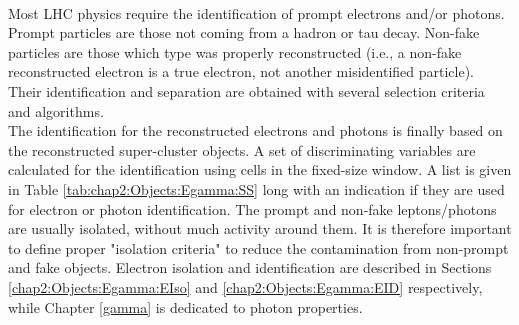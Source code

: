 \\
Most LHC physics require the identification of prompt electrons and/or photons. Prompt particles are those not coming from a hadron or tau decay. Non-fake particles are those which type was properly reconstructed (i.e., a non-fake reconstructed electron is a true electron, not another misidentified particle). Their identification and separation are obtained with several selection criteria and algorithms. \\
The identification for the reconstructed electrons and photons is finally based on the reconstructed super-cluster objects. A set of discriminating variables are calculated for the identification using cells in the fixed-size window. A list is given in Table \ref{tab:chap2:Objects:Egamma:SS} long with an indication if they are used for electron or photon identification. The prompt and non-fake leptons/photons are usually isolated, without much activity around them. It is therefore important to define proper "isolation criteria" to reduce the contamination from non-prompt and fake objects. Electron isolation and identification are described in Sections \ref{chap2:Objects:Egamma:EIso} and \ref{chap2:Objects:Egamma:EID} respectively, while Chapter \ref{gamma} is dedicated to photon properties.
